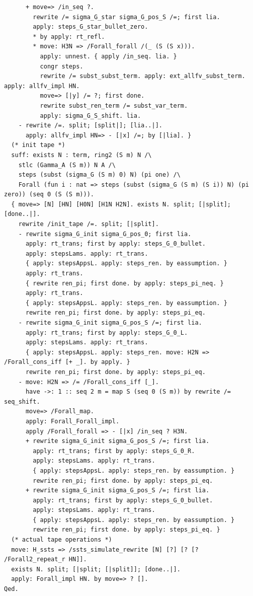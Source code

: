 \begin{lstlisting}
      + move=> /in_seq ?.
        rewrite /= sigma_G_star sigma_G_pos_S /=; first lia.
        apply: steps_G_star_bullet_zero.
        * by apply: rt_refl.
        * move: H3N => /Forall_forall /(_ (S (S x))).
          apply: unnest. { apply /in_seq. lia. }
          congr steps.
          rewrite /= subst_subst_term. apply: ext_allfv_subst_term. apply: allfv_impl HN.
          move=> [|y] /= ?; first done.
          rewrite subst_ren_term /= subst_var_term.
          apply: sigma_G_S_shift. lia.
    - rewrite /=. split; [split|]; [lia..|].
      apply: allfv_impl HN=> - [|x] /=; by [|lia]. }
  (* init tape *)
  suff: exists N : term, ring2 (S m) N /\
    stlc (Gamma_A (S m)) N A /\
    steps (subst (sigma_G (S m) 0) N) (pi one) /\
    Forall (fun i : nat => steps (subst (sigma_G (S m) (S i)) N) (pi zero)) (seq 0 (S (S m))).
  { move=> [N] [HN] [H0N] [H1N H2N]. exists N. split; [|split]; [done..|].
    rewrite /init_tape /=. split; [|split].
    - rewrite sigma_G_init sigma_G_pos_0; first lia.
      apply: rt_trans; first by apply: steps_G_0_bullet.
      apply: stepsLams. apply: rt_trans.
      { apply: stepsAppsL. apply: steps_ren. by eassumption. }
      apply: rt_trans.
      { rewrite ren_pi; first done. by apply: steps_pi_neq. }
      apply: rt_trans.
      { apply: stepsAppsL. apply: steps_ren. by eassumption. }
      rewrite ren_pi; first done. by apply: steps_pi_eq.
    - rewrite sigma_G_init sigma_G_pos_S /=; first lia.
      apply: rt_trans; first by apply: steps_G_0_L.
      apply: stepsLams. apply: rt_trans.
      { apply: stepsAppsL. apply: steps_ren. move: H2N => /Forall_cons_iff [+ _]. by apply. }
      rewrite ren_pi; first done. by apply: steps_pi_eq.
    - move: H2N => /= /Forall_cons_iff [_].
      have ->: 1 :: seq 2 m = map S (seq 0 (S m)) by rewrite /= seq_shift.
      move=> /Forall_map.
      apply: Forall_Forall_impl.
      apply /Forall_forall => - [|x] /in_seq ? H3N.
      + rewrite sigma_G_init sigma_G_pos_S /=; first lia.
        apply: rt_trans; first by apply: steps_G_0_R.
        apply: stepsLams. apply: rt_trans.
        { apply: stepsAppsL. apply: steps_ren. by eassumption. }
        rewrite ren_pi; first done. by apply: steps_pi_eq.
      + rewrite sigma_G_init sigma_G_pos_S /=; first lia.
        apply: rt_trans; first by apply: steps_G_0_bullet.
        apply: stepsLams. apply: rt_trans.
        { apply: stepsAppsL. apply: steps_ren. by eassumption. }
        rewrite ren_pi; first done. by apply: steps_pi_eq. }
  (* actual tape operations *)
  move: H_ssts => /ssts_simulate_rewrite [N] [?] [? [? /Forall2_repeat_r HN]].
  exists N. split; [|split; [|split]]; [done..|].
  apply: Forall_impl HN. by move=> ? [].
Qed.


\end{lstlisting}
